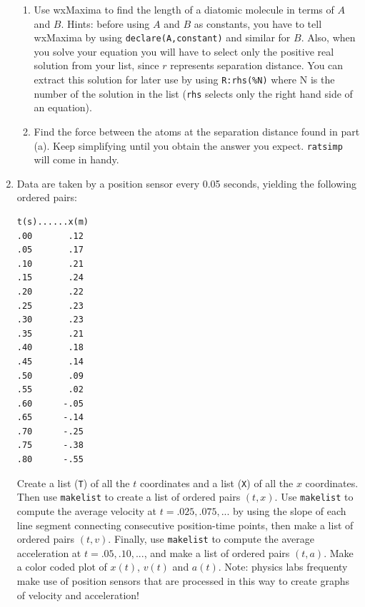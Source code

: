 \documentclass[10.5pt,twoside]{report}
\theoremstyle{definition}
\begin{document}
\begin{enumerate}
 \begin{enumerate}

  \item Use wxMaxima to find the length of a diatomic molecule in terms of $A$ and $B$. Hints: before using $A$ and $B$ as constants, you have to tell wxMaxima by using \verb|declare(A,constant)| and similar for $B$. Also, when you solve your equation you will have to select only the positive real solution from your list, since $r$ represents separation distance.  You can extract this solution for later use by using \verb|R:rhs(%N)| where N is the number of the solution in the list (\verb|rhs| selects only the right hand side of an equation).

  \item Find the force between the atoms at the separation distance found in part (a).  Keep simplifying until you obtain the answer you expect.  \verb|ratsimp| will come in handy.
  
 \end{enumerate}
 

 
\item  Data are taken by a position sensor every 0.05 seconds, yielding the following ordered pairs:

\begin{verbatim}
t(s)......x(m)
.00       .12
.05       .17
.10       .21
.15       .24
.20       .22
.25       .23
.30       .23
.35       .21
.40       .18
.45       .14
.50       .09
.55       .02
.60      -.05
.65      -.14
.70      -.25
.75      -.38
.80      -.55
\end{verbatim}

Create a list (\verb|T|) of all the $t$ coordinates and a list (\verb|X|) of all the $x$ coordinates.  Then use \verb|makelist| to create a list of ordered pairs  $(t,x)$.  Use \verb|makelist| to compute the average velocity at $t=.025,.075,...$ by using the slope of each line segment connecting consecutive position-time points, then make a list of ordered pairs $(t,v)$. Finally, use \verb|makelist| to compute the average acceleration at $t=.05,.10,...$, and make a list of ordered pairs $(t,a)$.  Make a color coded plot of $x(t)$, $v(t)$ and $a(t)$.  Note:  physics labs frequenty make use of position sensors that are processed in this way to create graphs of velocity and acceleration!

\end{enumerate}

\pagebreak
\end{document}
